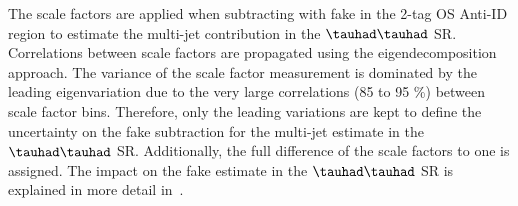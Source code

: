 The scale factors are applied when subtracting \ttbar with fake
\tauhad in the 2-tag OS Anti-ID region to estimate the multi-jet
contribution in the $\tauhad\tauhad$ SR. Correlations between scale
factors are propagated using the eigendecomposition approach. The
variance of the scale factor measurement is dominated by the leading
eigenvariation due to the very large correlations (85 to 95 \%)
between scale factor bins. Therefore, only the leading variations are
kept to define the uncertainty on the fake \tauhad \ttbar subtraction
for the multi-jet estimate in the $\tauhad\tauhad$ SR. Additionally,
the full difference of the scale factors to one is assigned. The
impact on the fake estimate in the $\tauhad\tauhad$ SR is explained in
more detail in~.

\FloatBarrier
